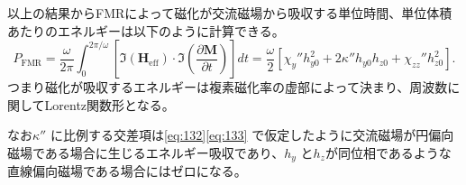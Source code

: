 \documentclass[dvipdfmx]{jsreport}
\numberwithin{equation}{chapter}
\numberwithin{table}{chapter}
\begin{document}
以上の結果からFMRによって磁化が交流磁場から吸収する単位時間、単位体積あたりのエネルギーは以下のように計算できる。
\begin{equation}
\label{eq:147}
	P_\text{FMR} =\frac{\omega}{2\pi }\int_{0}^{2\pi  /\omega}  \left[ \Im(\bm{H}_\text{eff}) \cdot \Im\left( \frac{\partial \bm{M}}{\partial t}  \right)   \right] dt=\frac{\omega}{2}\left[ \chi_{y}''h^2_{y0}+2\kappa'' h_{y0}h_{z 0}+\chi_{zz}''h^2_{z 0} \right] 
.\end{equation}
つまり磁化が吸収するエネルギーは複素磁化率の虚部によって決まり、周波数に関してLorentz関数形となる。

なお$\kappa''$ に比例する交差項は\eqref{eq:132}\eqref{eq:133}
で仮定したように交流磁場が円偏向磁場である場合に生じるエネルギー吸収であり、$h_y$ と$h_z$が同位相であるような直線偏向磁場である場合にはゼロになる。
\end{document}

